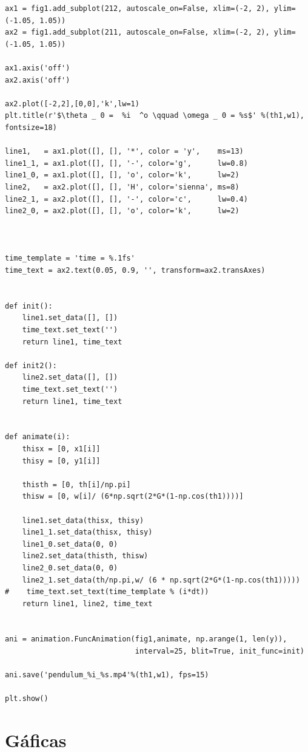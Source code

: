 \documentclass[11pt,spanish]{article}
\begin{document}
\begin{lstlisting}
ax1 = fig1.add_subplot(212, autoscale_on=False, xlim=(-2, 2), ylim=(-1.05, 1.05))
ax2 = fig1.add_subplot(211, autoscale_on=False, xlim=(-2, 2), ylim=(-1.05, 1.05))

ax1.axis('off')
ax2.axis('off')

ax2.plot([-2,2],[0,0],'k',lw=1)
plt.title(r'$\theta _ 0 =  %i  ^o \qquad \omega _ 0 = %s$' %(th1,w1), fontsize=18)

line1,   = ax1.plot([], [], '*', color = 'y',    ms=13)
line1_1, = ax1.plot([], [], '-', color='g',      lw=0.8)
line1_0, = ax1.plot([], [], 'o', color='k',      lw=2)
line2,   = ax2.plot([], [], 'H', color='sienna', ms=8)
line2_1, = ax2.plot([], [], '-', color='c',      lw=0.4)
line2_0, = ax2.plot([], [], 'o', color='k',      lw=2)



time_template = 'time = %.1fs'
time_text = ax2.text(0.05, 0.9, '', transform=ax2.transAxes)


def init():
    line1.set_data([], [])
    time_text.set_text('')
    return line1, time_text

def init2():
    line2.set_data([], [])
    time_text.set_text('')
    return line1, time_text


def animate(i):
    thisx = [0, x1[i]]
    thisy = [0, y1[i]]
    
    thisth = [0, th[i]/np.pi]
    thisw = [0, w[i]/ (6*np.sqrt(2*G*(1-np.cos(th1))))]

    line1.set_data(thisx, thisy)
    line1_1.set_data(thisx, thisy)
    line1_0.set_data(0, 0)
    line2.set_data(thisth, thisw)
    line2_0.set_data(0, 0)
    line2_1.set_data(th/np.pi,w/ (6 * np.sqrt(2*G*(1-np.cos(th1)))))
#    time_text.set_text(time_template % (i*dt))
    return line1, line2, time_text


ani = animation.FuncAnimation(fig1,animate, np.arange(1, len(y)),
                              interval=25, blit=True, init_func=init)

ani.save('pendulum_%i_%s.mp4'%(th1,w1), fps=15)

plt.show()

\end{lstlisting}


\section*{Gáficas}

\centering
\end{document}
